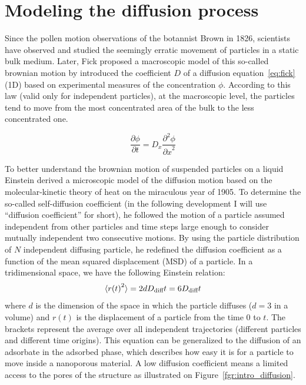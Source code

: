 \documentclass[main]{subfiles}
\begin{document}
\section{Modeling the diffusion process}

Since the pollen motion observations of the botannist Brown in 1826, scientists have observed and studied the seemingly erratic movement of particles in a static bulk medium. Later, Fick proposed a macroscopic model of this so-called brownian motion by introduced the coefficient $D$ of a diffusion equation~\ref{eq:fick} (1D) based on experimental measures of the concentration $\phi$.\autocite{Fick_1855} According to this law (valid only for independent particles), at the macroscopic level, the particles tend to move from the most concentrated area of the bulk to the less concentrated one. 

\begin{equation}\label{eq:fick}
  \frac{\partial \phi}{\partial t} = D_x \frac{\partial^2 \phi}{{\partial x}^2}
\end{equation}

To better understand the brownian motion of suspended particles on a liquid Einstein derived a microscopic model of the diffusion motion based on the molecular-kinetic theory of heat on the miraculous year of 1905.\autocite{einstein1905motion} To determine the so-called self-diffusion coefficient (in the following development I will use ``diffusion coefficient'' for short), he followed the motion of a particle assumed independent from other particles and time steps large enough to consider mutually independent two consecutive motions. By using the particle distribution of $N$ independent diffusing particle, he redefined the diffusion coefficient as a function of the mean squared displacement (MSD) of a particle. In a tridimensional space, we have the following Einstein relation:
\begin{equation}\label{eq:einstein}
  \langle {r(t)}^2 \rangle = 2dD_{\text{diff}}t = 6D_{\text{diff}}t
\end{equation}
where  $d$ is the dimension of the space in which the particle diffuses ($d=3$ in a volume) and $r(t)$ is the displacement of a particle from the time $0$ to $t$. The brackets represent the average over all independent trajectories (different particles and different time origins). This equation can be generalized to the diffusion of an adsorbate in the adsorbed phase, which describes how easy it is for a particle to move inside a nanoporous material. A low diffusion coefficient means a limited access to the pores of the structure as illustrated on Figure~\ref{fgr:intro_diffusion}.
\end{document}
